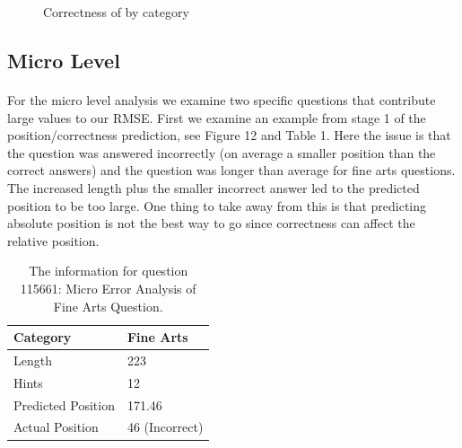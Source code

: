 \documentclass[letterpaper]{article}
\begin{document}
\begin{figure}[H]
	\begin{center}
	\end{center}
	\caption{Correctness of by category}
	\label{fig:corr_off}
\end{figure}

\subsection{Micro Level}
\label{sec:micro}
\paragraph{} For the micro level analysis we examine two specific questions that contribute large values to our RMSE.  First we examine an example from stage 1 of the position/correctness prediction, see Figure 12 and Table 1.  Here the issue is that the question was answered incorrectly (on average a smaller position than the correct answers) and the question was longer than average for fine arts questions.  The increased length plus the smaller incorrect answer led to the predicted position to be too large.  One thing to take away from this is that predicting absolute position is not the best way to go since correctness can affect the relative position. 


\begin{table}[H]
\centering
\begin{tabular}{|l|l |}
\hline
Category & Fine Arts \\ \hline
Length &  223 \\
Hints & 12 \\
Predicted Position & 171.46 \\
Actual Position & 46 (Incorrect) \\ \hline

\end{tabular}
\caption{The information for question 115661: Micro Error Analysis of Fine Arts Question.}
\end{table}
\label{table:ex_art}
\end{document}
